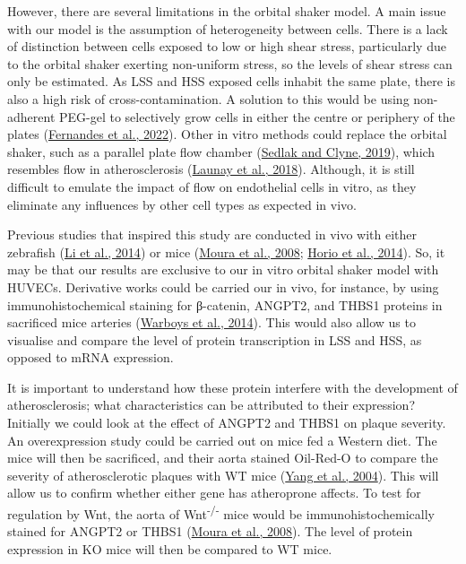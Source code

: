 \documentclass[
  11pt,
]{article}
\begin{document}
However, there are several limitations in the orbital shaker model.
A main issue with our model is the assumption of heterogeneity between cells.
There is a lack of distinction between cells exposed to low or high shear stress, particularly due to the orbital shaker exerting non-uniform stress, so the levels of shear stress can only be estimated.
As LSS and HSS exposed cells inhabit the same plate, there is also a high risk of cross-contamination.
A solution to this would be using non-adherent PEG-gel to selectively grow cells in either the centre or periphery of the plates (\protect\hyperlink{ref-Fernandes2022}{Fernandes et al., 2022}).
Other in vitro methods could replace the orbital shaker, such as a parallel plate flow chamber (\protect\hyperlink{ref-sedlak2019}{Sedlak and Clyne, 2019}), which resembles flow in atherosclerosis (\protect\hyperlink{ref-Launay2018}{Launay et al., 2018}).
Although, it is still difficult to emulate the impact of flow on endothelial cells in vitro, as they eliminate any influences by other cell types as expected in vivo.

Previous studies that inspired this study are conducted in vivo with either zebrafish (\protect\hyperlink{ref-Li2014-mx}{Li et al., 2014}) or mice (\protect\hyperlink{ref-Moura2008}{Moura et al., 2008}; \protect\hyperlink{ref-horio2014}{Horio et al., 2014}).
So, it may be that our results are exclusive to our in vitro orbital shaker model with HUVECs.
Derivative works could be carried our in vivo, for instance, by using immunohistochemical staining for β-catenin, ANGPT2, and THBS1 proteins in sacrificed mice arteries (\protect\hyperlink{ref-Warboys2014}{Warboys et al., 2014}).
This would also allow us to visualise and compare the level of protein transcription in LSS and HSS, as opposed to mRNA expression.

It is important to understand how these protein interfere with the development of atherosclerosis; what characteristics can be attributed to their expression?
Initially we could look at the effect of ANGPT2 and THBS1 on plaque severity.
An overexpression study could be carried out on mice fed a Western diet.
The mice will then be sacrificed, and their aorta stained Oil-Red-O to compare the severity of atherosclerotic plaques with WT mice (\protect\hyperlink{ref-yang2004}{Yang et al., 2004}).
This will allow us to confirm whether either gene has atheroprone affects.
To test for regulation by Wnt, the aorta of Wnt\textsuperscript{-/-} mice would be immunohistochemically stained for ANGPT2 or THBS1 (\protect\hyperlink{ref-Moura2008}{Moura et al., 2008}).
The level of protein expression in KO mice will then be compared to WT mice.
\end{document}
